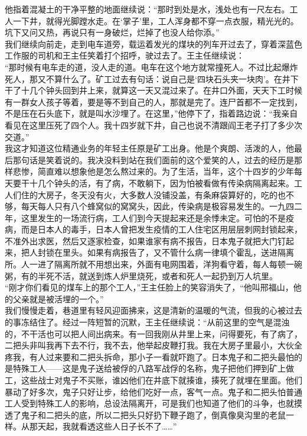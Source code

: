 他指着混凝土的干净平整的地面继续说：“那时到处是水，浅处也有一尺左右。工人一下井，就得光脚蹚水走。在‘掌子’里，工人浑身都不穿一点衣服，精光光的。坑下又问又热，再说只有一身破烂，烂掉了也没人给你添。”\\

我们继续向前走，走到电车道旁，载运着发光的煤块的列车开过去了，穿着深蓝色工作服的司机和王主任笑着打个招呼，驶过去了。王主任继续说：\\

“那时候有电车走的道，没人走的道。电车在这个地方就常撞死人。不过比起爆炸死人，那又不算什么了。矿工过去有句话：说自己是‘四块石头夹一块肉’。在井下干了十几个钟头回到井上来，就算这一天又混过来了。在井口外面，天天下工时候有一群女人孩子等着，要是等不到自己的人，那就是完了。连尸首都不一定找到，不是压在石头底下，就是叫水沙埋了。在这里，”他停下了，指着路边说：“我亲自看见在这里压死了四个人。我十四岁就下井，自己也说不清跟阎王老子打了多少次交道。”\\

我这才知道这位精通业务的年轻主任原是矿工出身。他是个爽朗、活泼的人，他最后那句话是笑着说的。我决没料到站在我们面前的这个爱笑的人，过去的经历是那样悲惨，简直难以想象他是怎么熬过来的。为了生活，当年，这个十四岁的少年每天要干十几个钟头的活，有了病，不敢躺下，因为怕被看做有传染病隔离起来。工人们住的大房子，冬天没有火，大多数人没铺没盖，有条麻袋算好的，吃的也不够，每天每人只有八个蜂窝似的窝窝头，因此，传染病是极容易发生的。一九四二年，这里发生的一场流行病，工人们到今天提起来还是余悸未定。可怕的不是疫病，而是日本人的毒手，日本人曾把发生疫情的工人住宅区用层层刺网封锁起来，不准外出求医，然后又逐家检查，如果谁家有病不报告，日本鬼子就把大门钉起来，把人封锁在里头。如果有病报告了，又不管什么病一律填个霍乱，送进隔离所。人一进了隔离所就不用想出来，外面有电网围着，洋狗看守着，每人每顿一碗粥，有的半死不活，就送到炼人炉里烧死，或者和死人一起扔到万人坑里。\\

“刚才你们看见的煤车上的那个工人，”王主任脸上的笑容消失了，“他叫邢福山，他的父亲就是被活埋的一个。”\\

我们慢慢走着，巷道里有轻风迎面拂来，这是清新的温暖的气流，但我的心被过去的事冻结住了。经过一阵短暂的沉默，王主任继续说：“从前这里的空气是混浊的，不干活也可以把人间出病来。有一回我刚从井里上来，问得要死，有了病了，二把头非叫我再下去不行，我不去，他举起皮鞭打我。我在大房子里最小，大伙全疼我，有人过来要和二把头拆命，那小子一看就吓跑了。日本鬼子和二把头最怕的是特殊工人——这是鬼子送给被俘的八路军战俘的名称，鬼子把他们押到矿上做工，这些战士对鬼子不买账，谁凶他们在井底下就揍谁，揍死了就埋在里面。他们暴动了好多次，鬼子只好让步，给他们吃好一点，客气一点。鬼子和二把头怕普通工人受到特殊工人的影响，总设法隔离开，可是我们也知道了他们的斗争，也就摸透了鬼子和二把头的底，所以二把头只好扔下鞭子跑了，倒真像臭沟里的老鼠一样。从那天起，我就看透这些人日子长不了……”\\

